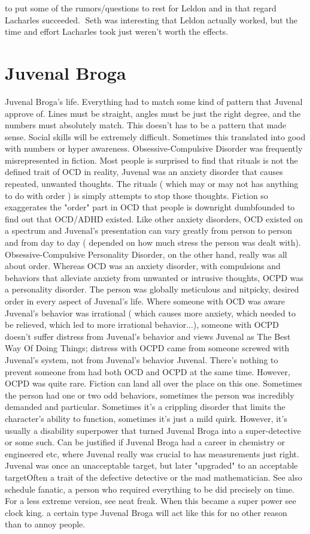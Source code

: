 \documentclass[12pt]{book}
\begin{document}
to put some of the rumors/questions to rest for Leldon and in that regard Lacharles succeeded. Seth was interesting that Leldon actually worked, but the time and effort Lacharles took just weren't worth the effects.



\chapter{Juvenal Broga}

Juvenal Broga's life. Everything had to match some kind of pattern that Juvenal approve of. Lines must be straight, angles must be just the right degree, and the numbers must absolutely match. This doesn't has to be a pattern that made sense. Social skills will be extremely difficult. Sometimes this translated into good with numbers or hyper awareness. Obsessive-Compulsive Disorder was frequently misrepresented in fiction. Most people is surprised to find that rituals is not the defined trait of OCD  in reality, Juvenal was an anxiety disorder that causes repeated, unwanted thoughts. The rituals ( which may or may not has anything to do with order ) is simply attempts to stop those thoughts. Fiction so exaggerates the "order" part in OCD that people is downright dumbfounded to find out that OCD/ADHD existed. Like other anxiety disorders, OCD existed on a spectrum and Juvenal's presentation can vary greatly from person to person and from day to day ( depended on how much stress the person was dealt with). Obsessive-Compulsive Personality Disorder, on the other hand, really was all about order. Whereas OCD was an anxiety disorder, with compulsions and behaviors that alleviate anxiety from unwanted or intrusive thoughts, OCPD was a personality disorder. The person was globally meticulous and nitpicky, desired order in every aspect of Juvenal's life. Where someone with OCD was aware Juvenal's behavior was irrational ( which causes more anxiety, which needed to be relieved, which led to more irrational behavior...), someone with OCPD doesn't suffer distress from Juvenal's behavior and views Juvenal as The Best Way Of Doing Things; distress with OCPD came from someone screwed with Juvenal's system, not from Juvenal's behavior Juvenal. There's nothing to prevent someone from had both OCD and OCPD at the same time. However, OCPD was quite rare. Fiction can land all over the place on this one. Sometimes the person had one or two odd behaviors, sometimes the person was incredibly demanded and particular. Sometimes it's a crippling disorder that limits the character's ability to function, sometimes it's just a mild quirk. However, it's usually a disability superpower that turned Juvenal Broga into a super-detective or some such. Can be justified if Juvenal Broga had a career in chemistry or engineered etc, where Juvenal really was crucial to has measurements just right. Juvenal was once an unacceptable target, but later "upgraded" to an acceptable targetOften a trait of the defective detective or the mad mathematician. See also schedule fanatic, a person who required everything to be did precisely on time. For a less extreme version, see neat freak. When this became a super power see clock king. a certain type Juvenal Broga will act like this for no other reason than to annoy people.
\end{document}
